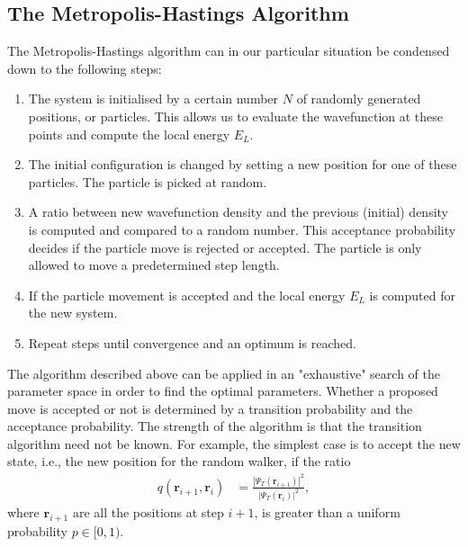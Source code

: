 \documentclass[
    a4paper, aps, twocolumn, floatfix, superscriptaddress, nofootinbib]{revtex4-1}
\newcommand{\vf}{\mathbf}
\newcommand{\1}{\mathds{1}}
\begin{document}
    \subsection{The Metropolis-Hastings Algorithm}
        The Metropolis-Hastings algorithm can in our particular situation be
        condensed down to the following steps:

        \begin{enumerate}
            \item The system is initialised by a certain number $N$ of randomly
                generated positions, or particles. This allows us to evaluate
                the wavefunction at these points and compute the local energy
                $E_L$.

            \item The initial configuration is changed by setting a new position
                for one of these particles. The particle is picked at random.

            \item A ratio between new wavefunction density and the previous
                (initial) density is computed and compared to a random number.
                This acceptance probability decides if the particle move is
                rejected or accepted.  The particle is only allowed to move a
                predetermined step length.

            \item If the particle movement is accepted and the local energy
                $E_L$ is computed for the new system.

            \item Repeat steps until convergence and an optimum is reached.

        \end{enumerate}

        The algorithm described above can be applied in an "exhaustive" search
        of the parameter space in order to find the optimal parameters.  Whether
        a proposed move is accepted or not is determined by a transition
        probability and the acceptance probability.  The strength of the
        algorithm is that the transition algorithm need not be known. For
        example, the simplest case is to accept the new state, i.e., the new
        position for the random walker, if the ratio
        \begin{align}
            q(\vf{r}_{i + 1}, \vf{r}_i)
            &=
            \frac{\left|\Psi_T(\vf{r}_{i + 1})\right|^2}
            {\left|\Psi_T(\vf{r}_{i})\right|^2},
        \end{align}
        where $\vf{r}_{i + 1}$ are all the positions at step $i + 1$, is greater
        than a uniform probability $p \in [0, 1)$.
\end{document}
